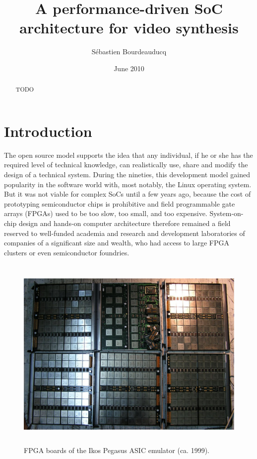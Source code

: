 \documentclass[a4paper,11pt]{kthesis}
\title{A performance-driven SoC architecture for video synthesis}
\date{June 2010}
\author{S\'ebastien Bourdeauducq}
\begin{document}
\begin{abstract}
TODO
\end{abstract}

\tableofcontents
\listoffigures
\listoftables

\mainmatter

\chapter{Introduction}
The open source model supports the idea that any individual, if he or she has the required level of technical knowledge, can realistically use, share and modify the design of a technical system. During the nineties, this development model gained popularity in the software world with, most notably, the Linux operating system. But it was not viable for complex SoCs until a few years ago, because the cost of prototyping semiconductor chips is prohibitive and field programmable gate arrays (FPGAs) used to be too slow, too small, and too expensive. System-on-chip design and hands-on computer architecture therefore remained a field reserved to well-funded academia and research and development laboratories of companies of a significant size and wealth, who had access to large FPGA clusters or even semiconductor foundries.

\begin{figure}[htp]
\centering
\includegraphics[height=95mm]{ikosboards.eps}
\caption{FPGA boards of the Ikos Pegasus ASIC emulator (ca. 1999).}
\label{fig:ikos}
\end{figure}
\end{document}
